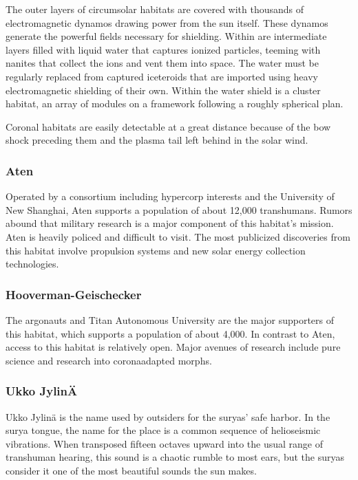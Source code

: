 The outer layers of circumsolar habitats are covered 
with thousands of electromagnetic dynamos drawing 
power from the sun itself. These dynamos generate 
the powerful fields necessary for shielding. Within 
are intermediate layers filled with liquid water that 
captures ionized particles, teeming with nanites that 
collect the ions and vent them into space. The water 
must be regularly replaced from captured iceteroids 
that are imported using heavy electromagnetic shielding of their own. Within the water shield is a cluster 
habitat, an array of modules on a framework following a roughly spherical plan.


Coronal habitats are easily detectable at a great distance because of the bow shock preceding them and 
the plasma tail left behind in the solar wind.

\subsubsection{Aten}

Operated by a consortium including hypercorp 
interests and the University of New Shanghai, Aten 
supports a population of about 12,000 transhumans. 
Rumors abound that military research is a major component of this habitat's mission. Aten is heavily policed 
and difficult to visit. The most publicized discoveries 
from this habitat involve propulsion systems and new 
solar energy collection technologies.

\subsubsection{Hooverman-Geischecker}

The argonauts and Titan Autonomous University are 
the major supporters of this habitat, which supports a 
population of about 4,000. In contrast to Aten, access 
to this habitat is relatively open. Major avenues of research include pure science and research into coronaadapted morphs.

\subsubsection{Ukko JylinÄ}

Ukko Jylinä is the name used by outsiders for the 
suryas' safe harbor. In the surya tongue, the name 
for the place is a common sequence of helioseismic 
vibrations. When transposed fifteen octaves upward 
into the usual range of transhuman hearing, this 
sound is a chaotic rumble to most ears, but the 
suryas consider it one of the most beautiful sounds 
the sun makes.

